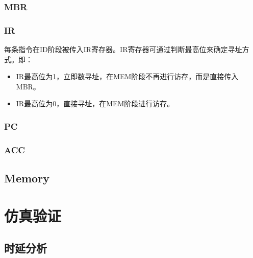 \documentclass[lang=cn,a4paper,newtx]{elegantpaper}
\begin{document}
\subsubsection{MBR}
\subsubsection{IR}
每条指令在ID阶段被传入IR寄存器。IR寄存器可通过判断最高位来确定寻址方式。即：
\begin{itemize}
  \item IR最高位为1，立即数寻址，在MEM阶段不再进行访存，而是直接传入MBR。
  \item IR最高位为0，直接寻址，在MEM阶段进行访存。
\end{itemize}

\subsubsection{PC}

\subsubsection{ACC}
\subsection{Memory}




\section{仿真验证}
\subsection{时延分析}
\end{document}
